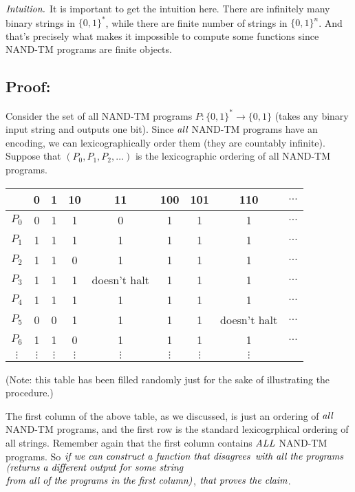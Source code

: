 \documentclass[11pt]{article}
\theoremstyle{definition}
\theoremstyle{remark}
\begin{document}
$\emph{Intuition.}$
It is important to get the intuition here. There are infinitely many binary strings in $\{0, 1\}^*$, while there are
finite number of strings in $\{ 0, 1\}^n$. And that's precisely what makes it impossible to compute some functions since
NAND-TM programs are finite objects.

\subsection{Proof:}

\proof
Consider the set of all NAND-TM programs $P: \{0, 1\}^* \rightarrow \{0, 1\}$ (takes any binary input string and outputs one bit). 
Since $\emph{all}$ NAND-TM programs have an encoding, we can lexicographically order them
(they are countably infinite). Suppose that $(P_0, P_1, P_2, \dots)$ is the lexicographic ordering of all NAND-TM programs.

\begin{center}
    \begin{tabular}{c|cccccccc}
         & 0 & 1 & 10 & 11 & 100 & 101 & 110 & $\dots$ \\ 
        \hline
        $P_0$ & \cellcolor{green!20}0 & 1 & 1 & 0 & 1 & 1 & 1 & $\dots$ \\ 
        $P_1$ & 1 & \cellcolor{green!20}1 & 1 & 1 & 1 & 1 & 1 & $\dots$ \\ 
        $P_2$ & 1 & 1 & \cellcolor{green!20}0 & 1 & 1 & 1 & 1 & $\dots$ \\ 
        $P_3$ & 1 & 1 & 1 & \cellcolor{green!20}doesn't halt & 1 & 1 & 1 & $\dots$ \\ 
        $P_4$ & 1 & 1 & 1 & 1 & \cellcolor{green!20}1 & 1 & 1 & $\dots$ \\ 
        $P_5$ & 0 & 0 & 1 & 1 & 1 & \cellcolor{green!20}1 & doesn't halt & $\dots$ \\ 
        $P_6$ & 1 & 1 & 0 & 1 & 1 & 1 & \cellcolor{green!20}1 & $\dots$ \\ 
        $\vdots$ & $\vdots$ & $\vdots$ & $\vdots$ & $\vdots$ & $\vdots$ & $\vdots$ & $\vdots$ & 
    \end{tabular}
\end{center}

(Note: this table has been filled randomly just for the sake of illustrating the procedure.)

The first column of the above table, as we discussed, is just an ordering of $\emph{all}$ NAND-TM programs, and
the first row is the standard lexicogrphical ordering of all strings. Remember again that the first column contains
$\emph{ALL}$ NAND-TM programs. So $\emph{if we can construct a function that disagrees}$
$\emph{with all the programs}$ $\emph{(returns a different output for some
string}$
$\emph{from all of the programs in the
first column)}$, $\emph{that proves the claim}$.
\end{document}

